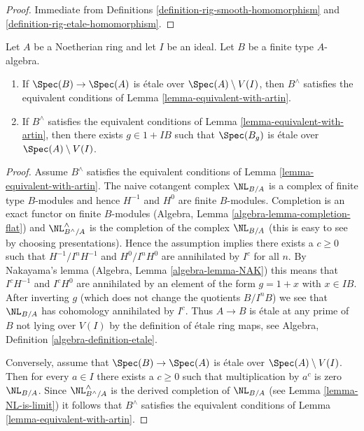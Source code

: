 \begin{proof}
Immediate from Definitions \ref{definition-rig-smooth-homomorphism} and
\ref{definition-rig-etale-homomorphism}.
\end{proof}

\begin{lemma}
\label{lemma-rig-etale}
Let $A$ be a Noetherian ring and let $I$ be an ideal.
Let $B$ be a finite type $A$-algebra.
\begin{enumerate}
\item If $\Spec(B) \to \Spec(A)$ is \'etale over $\Spec(A) \setminus V(I)$,
then $B^\wedge$ satisfies the equivalent conditions of
Lemma \ref{lemma-equivalent-with-artin}.
\item If $B^\wedge$ satisfies the equivalent conditions of
Lemma \ref{lemma-equivalent-with-artin},
then there exists $g \in 1 + IB$ such that $\Spec(B_g)$ is \'etale
over $\Spec(A) \setminus V(I)$.
\end{enumerate}
\end{lemma}

\begin{proof}
Assume $B^\wedge$ satisfies the equivalent conditions of
Lemma \ref{lemma-equivalent-with-artin}.
The naive cotangent complex $\NL_{B/A}$ is a complex of finite type
$B$-modules and hence $H^{-1}$ and $H^0$ are finite $B$-modules.
Completion is an exact functor on finite $B$-modules (Algebra,
Lemma \ref{algebra-lemma-completion-flat}) and $\NL_{B^\wedge/A}^\wedge$
is the completion of the complex $\NL_{B/A}$ (this is easy to see
by choosing presentations).
Hence the assumption implies there exists a $c \geq 0$ such that
$H^{-1}/I^nH^{-1}$ and $H^0/I^nH^0$ are annihilated by $I^c$
for all $n$. By Nakayama's lemma (Algebra, Lemma \ref{algebra-lemma-NAK})
this means that $I^cH^{-1}$ and $I^cH^0$ are annihilated by an element
of the form $g = 1 + x$ with $x \in IB$. After inverting $g$
(which does not change the quotients $B/I^nB$)
we see that $\NL_{B/A}$ has cohomology annihilated by $I^c$. Thus
$A \to B$ is \'etale at any prime of $B$ not lying over $V(I)$
by the definition of \'etale ring maps, see
Algebra, Definition \ref{algebra-definition-etale}.

\medskip\noindent
Conversely, assume that $\Spec(B) \to \Spec(A)$ is \'etale over
$\Spec(A) \setminus V(I)$. Then for every $a \in I$ there exists
a $c \geq 0$ such that multiplication by $a^c$ is zero $\NL_{B/A}$.
Since $\NL_{B^\wedge/A}^\wedge$ is the derived completion of
$\NL_{B/A}$ (see Lemma \ref{lemma-NL-is-limit}) it follows that
$B^\wedge$ satisfies the equivalent conditions of
Lemma \ref{lemma-equivalent-with-artin}.
\end{proof}

